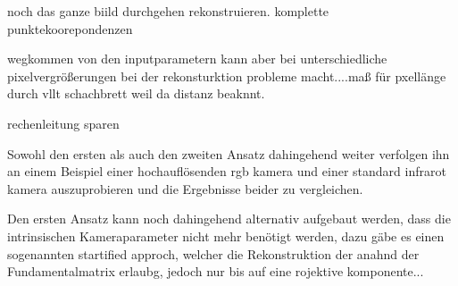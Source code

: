 noch das ganze biild durchgehen rekonstruieren. 
komplette punktekoorepondenzen

wegkommen von den inputparametern kann aber bei unterschiedliche pixelvergrößerungen bei der rekonsturktion probleme macht....maß für pxellänge durch vllt schachbrett weil da distanz beaknnt.

rechenleitung sparen 



Sowohl den ersten als auch den zweiten Ansatz dahingehend weiter verfolgen ihn an einem Beispiel einer hochauflösenden rgb kamera und einer standard infrarot kamera auszuprobieren und die Ergebnisse beider zu vergleichen. 

Den ersten Ansatz kann noch dahingehend alternativ aufgebaut werden, dass die intrinsischen Kameraparameter nicht mehr benötigt werden, dazu gäbe es einen sogenannten startified approch, welcher die Rekonstruktion der anahnd der Fundamentalmatrix erlaubg, jedoch nur bis auf eine rojektive komponente...

